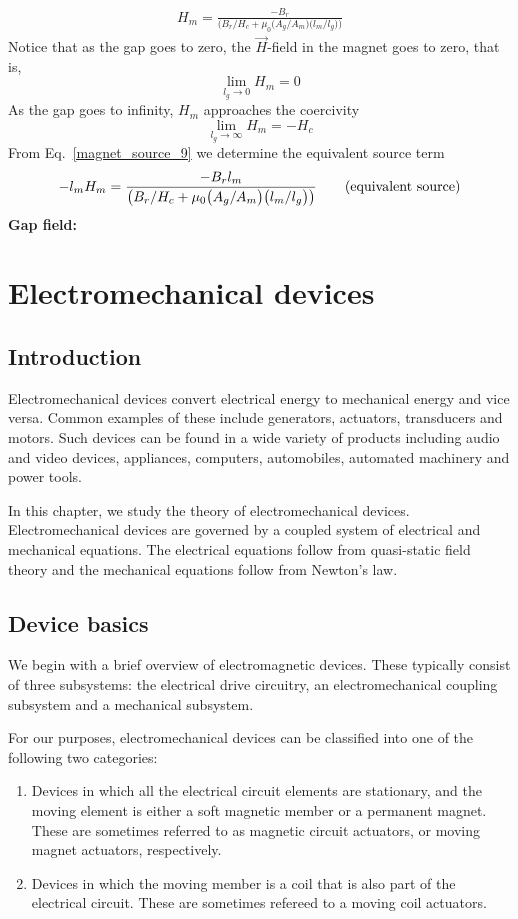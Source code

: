 \documentclass[12pt,a4paper,oneside]{book}
\begin{document}
\begin{onehalfspace}
\begin{example}
\begin{equation}
{\begin{aligned}
			H_m=\frac{-B_r}{\big(B_r/H_c+\mu_0\big(A_g/A_m\big)\big(l_m/l_g\big)\big)}
	\end{aligned}}
\end{equation}
Notice that as the gap goes to zero, the $\vec{H}$-field in the magnet goes to zero, that is, $$\lim\limits_{l_g\rightarrow0}H_m=0$$ As the gap goes to infinity, $H_m$ approaches the coercivity $$\lim\limits_{l_g\rightarrow\infty}H_m=-H_c$$ From Eq.~\eqref{magnet_source_9} we determine the equivalent source term
\begin{equation}\label{magnet_source_10}
	{\begin{aligned}
	-l_mH_m=\frac{-B_rl_m}{\big(B_r/H_c+\mu_0\big(A_g/A_m\big)\big(l_m/l_g\big)\big)} \qquad\text{\textnormal (equivalent source)}
	\end{aligned}}
\end{equation}
\textbf{Gap field:}
\end{example}




\chapter{Electromechanical devices}
\section{Introduction}
Electromechanical devices convert electrical energy to mechanical energy and vice versa. Common examples of these include generators, actuators, transducers and motors. Such devices can be found in a wide variety of products including audio and video devices, appliances, computers, automobiles, automated machinery and power tools.

In this chapter, we study the theory of electromechanical devices. Electromechanical devices are governed by a coupled system of electrical and mechanical equations. The electrical equations follow from quasi-static field theory and the mechanical equations follow from Newton's law.

\section{Device basics}
We begin with a brief overview of electromagnetic devices. These typically consist of three subsystems: the electrical drive circuitry, an electromechanical coupling subsystem and a mechanical subsystem.

For our purposes, electromechanical devices can be classified into one of the following two categories:
\begin{enumerate}
	\item Devices in which all the electrical circuit elements are stationary, and the moving element is either a soft magnetic member or a permanent magnet. These are sometimes referred to as magnetic circuit actuators, or moving magnet actuators, respectively.
	\item Devices in which the moving member is a coil that is also part of the electrical circuit. These are sometimes refereed to a moving coil actuators.
\end{enumerate}


\end{onehalfspace}
\end{document}
